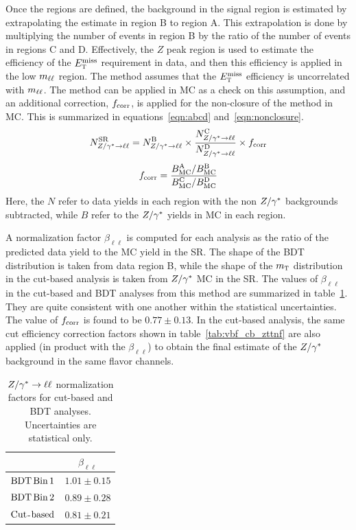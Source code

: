 Once the regions are defined, the background in the signal region is estimated by extrapolating the estimate in region B to region A. This extrapolation is done by multiplying the number of events in region B by the ratio of the number of events in regions C and D. Effectively, the $Z$ peak region is used to estimate the efficiency of the $E_{\textrm{\footnotesize\sc t}}^{\rm miss}$ requirement in data, and then this efficiency is applied in the low $m_{\ell\ell}$ region. The method assumes that the $E_{\textrm{\footnotesize\sc t}}^{\rm miss}$ efficiency is uncorrelated with $m_{\ell\ell}$. The method can be applied in MC as a check on this assumption, and an additional correction, $f_{\rm corr}$, is applied for the non-closure of the method in MC. This is summarized in equations~\ref{eqn:abcd} and~\ref{eqn:nonclosure}.
%
\begin{equation}
N^{\rm SR}_{Z/\gamma^{\ast}\to\ell\ell} = N^{\rm B}_{Z/\gamma^{\ast}\to\ell\ell}  \times \frac{N^{\rm C}_{Z/\gamma^{\ast}\to\ell\ell}}{N^{\rm D}_{Z/\gamma^{\ast}\to\ell\ell} } \times f_{\rm corr}
\label{eqn:abcd}
\end{equation}
%
\begin{equation}
f_{\rm corr} = \frac{B_{\rm MC}^{\rm A}/B_{\rm MC}^{\rm B}}{B_{\rm MC}^{\rm C}/B_{\rm MC}^{\rm D}}
\label{eqn:nonclosure}
\end{equation}
%
Here, the $N$ refer to data yields in each region with the non $Z/\gamma^{\ast}$ backgrounds subtracted, while $B$ refer to the $Z/\gamma^{\ast}$ yields in MC in each region.

A normalization factor $\beta_{\ell\ell}$ is computed for each analysis as the ratio of the predicted data yield to the MC yield in the SR. The shape of the BDT distribution is taken from data region B, while the shape of the $m_{\textrm{\footnotesize\sc t}}$ distribution in the cut-based analysis is taken from $Z/\gamma^{\ast}$ MC in the SR. The values of $\beta_{\ell\ell}$ in the cut-based and BDT analyses from this method are summarized in table~\ref{tab:vbf_sf_nf}. They are quite consistent with one another within the statistical uncertainties. The value of $f_{\rm corr}$ is found to be $0.77\pm 0.13$. In the cut-based analysis, the same cut efficiency correction factors shown in table~\ref{tab:vbf_cb_zttnf} are also applied (in product with the $\beta_{\ell\ell}$) to obtain the final estimate of the $Z/\gamma^{\ast}$ background in the same flavor channels. 

\begin{table}[h!]
\centering
\captionsetup{justification=centering}
\begin{tabular}{|c|c|}
\hline
& $\beta_{\ell\ell}$ \\ \hline
$\rm BDT\,Bin\,1$ & $1.01 \pm 0.15$ \\ \hline
$\rm BDT\,Bin\,2$ & $0.89 \pm 0.28$ \\ \hline
$\rm Cut$-$\rm based$ & $0.81 \pm 0.21$ \\ \hline
\end{tabular}
\caption{$Z/\gamma^{\ast} \to \ell\ell$ normalization factors for cut-based and BDT analyses. Uncertainties are statistical only.}
\label{tab:vbf_sf_nf}
\end{table}

